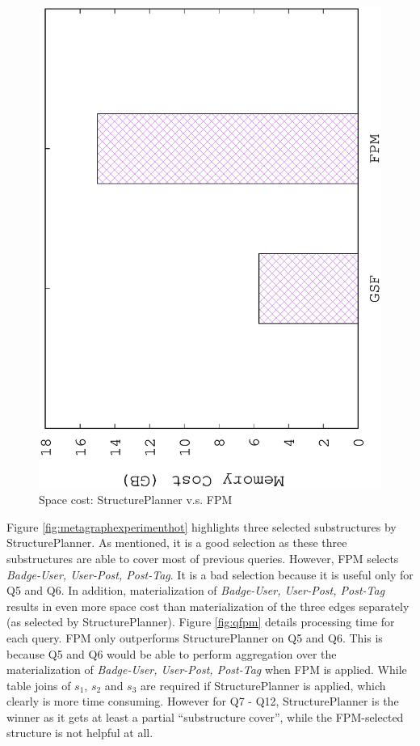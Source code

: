 \begin{figure}[H]
	\centering
	\includegraphics[scale=0.5, angle=270]{plot/fpm_space}
	\caption{Space cost: StructurePlanner v.s. FPM}
	\label{fig:fpmspace}
\end{figure}

Figure \ref{fig:metagraphexperimenthot} highlights three selected substructures by StructurePlanner. As mentioned, it is a good selection as these three substructures are able to cover most of previous queries. However, FPM selects \textit{Badge-User, User-Post, Post-Tag}. It is a bad selection because it is useful only for Q5 and Q6. In addition, materialization of \textit{Badge-User, User-Post, Post-Tag} results in even more space cost than materialization of the three edges separately (as selected by StructurePlanner). Figure \ref{fig:qfpm} details processing time for each query. FPM only outperforms StructurePlanner on Q5 and Q6. This is because Q5 and Q6 would be able to perform aggregation over the materialization of \textit{Badge-User, User-Post, Post-Tag} when FPM is applied. While table joins of $s_1$, $s_2$ and $s_3$ are required if StructurePlanner is applied, which clearly is more time consuming. However for Q7 - Q12, StructurePlanner is the winner as it gets at least a partial ``substructure cover'', while the FPM-selected structure is not helpful at all. 

